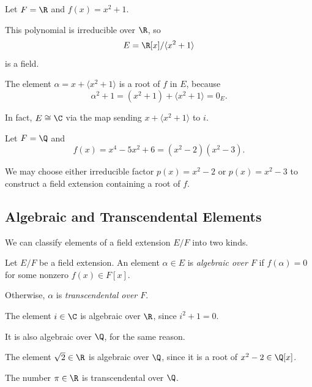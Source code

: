 \documentclass[main.tex]{subfiles}
\begin{document}

\begin{example}
Let $F=\R$ and $f(x)=x^2+1$.

This polynomial is irreducible over $\R$, so
\[
E=\R[x]/\langle x^2+1\rangle
\]
is a field.

The element $\alpha=x+\langle x^2+1\rangle$ is a root of $f$
in $E$, because
\[
\alpha^2+1=(x^2+1)+\langle x^2+1\rangle=0_E.
\]

In fact, $E\cong\C$ via the map sending
$x+\langle x^2+1\rangle$ to $i$.
\end{example}


\begin{example}
Let $F=\Q$ and
\[
f(x)=x^4-5x^2+6=(x^2-2)(x^2-3).
\]

We may choose either irreducible factor
$p(x)=x^2-2$ or $p(x)=x^2-3$ to construct a field
extension containing a root of $f$.
\end{example}


\subsection{Algebraic and Transcendental Elements}

We can classify elements of a field extension $E/F$ into two kinds.

\begin{definition}
Let $E/F$ be a field extension. An element $\alpha\in E$ is
\emph{algebraic over $F$} if $f(\alpha)=0$ for some nonzero
$f(x)\in F[x]$.

Otherwise, $\alpha$ is \emph{transcendental over $F$}.
\end{definition}


\begin{example}
The element $i\in\C$ is algebraic over $\R$, since
$i^2+1=0$.

It is also algebraic over $\Q$, for the same reason.
\end{example}


\begin{example}
The element $\sqrt{2}\in\R$ is algebraic over $\Q$, since
it is a root of $x^2-2\in\Q[x]$.
\end{example}


\begin{example}
The number $\pi\in\R$ is transcendental over $\Q$.
\end{example}
\end{document}
